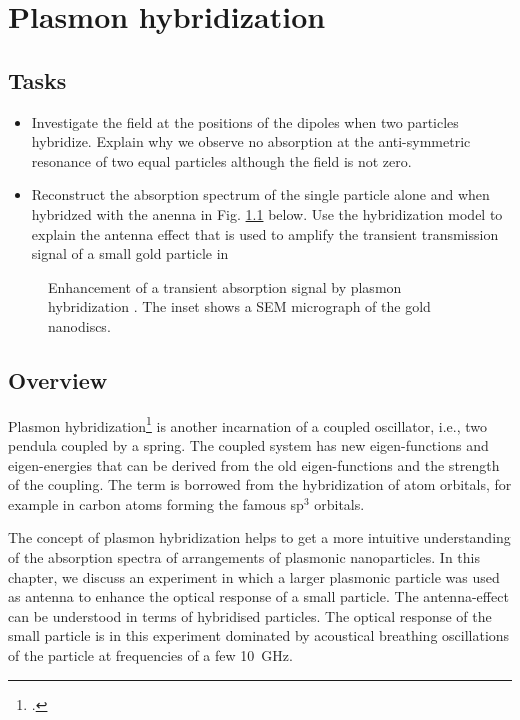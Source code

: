 


\chapter{Plasmon hybridization}
\label{chap:hybrid}

\section{Tasks}

\begin{itemize}
\item Investigate the field at the positions of the dipoles when two particles hybridize. Explain why we observe no absorption at the anti-symmetric resonance of two equal particles although the field is not zero.

\item Reconstruct the absorption spectrum of the single particle alone and when hybridzed with the anenna in Fig. \ref{fig:hybrid_schumacher11} below.
Use the hybridization model to explain the antenna effect that is used to amplify the transient transmission signal of a small gold particle in \cite{Schumacher11} 

\end{itemize}

\begin{figure}

\caption{Enhancement of a transient absorption signal by plasmon hybridization \cite{Schumacher11}. The inset shows a SEM micrograph of the gold nanodiscs.
 \label{fig:hybrid_schumacher11}}
\end{figure}


\section{Overview}

Plasmon hybridization\footcite{Prodan03} is another incarnation of a coupled oscillator, i.e., two pendula coupled by a spring. The coupled system has new eigen-functions and eigen-energies that can be derived from the old eigen-functions and the strength of the coupling. The term is borrowed from the hybridization of atom orbitals, for example in carbon atoms forming  the famous sp$^3$ orbitals.

The concept of plasmon hybridization helps to get a more intuitive understanding of the absorption spectra of arrangements of plasmonic nanoparticles. In this chapter, we discuss an experiment in which a larger plasmonic particle was used as  antenna to enhance the optical response of a small particle. The antenna-effect can be understood in terms of hybridised particles. The optical response of the small particle is in this experiment dominated by acoustical breathing oscillations of the particle at frequencies of a few 10~GHz.


